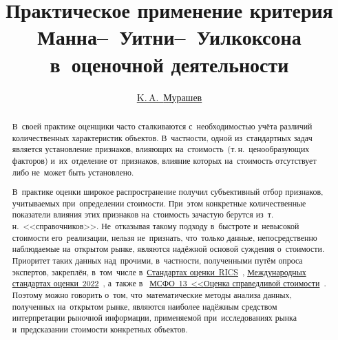 \documentclass[]{scrreprt}
\title{Практическое применение критерия Манна--~Уитни--~Уилкоксона в~оценочной деятельности}
\author{\href{https://www.facebook.com/murashev.kirill/}{K.\,A.~{Мурашев}}}
\begin{document}
	
\maketitle
%
%	
\begin{abstract}
	В~своей практике оценщики часто сталкиваются с~необходимостью учёта различий количественных характеристик объектов. В~частности, одной из~стандартных задач является установление признаков, влияющих на~стоимость~(т.\,н.~ценообразующих факторов) и~их~отделение от~признаков, влияние которых на~стоимость отсутствует либо не~может быть установлено.
	
	В~практике оценки широкое распространение получил субъективный отбор признаков, учитываемых при~определении стоимости. При~этом конкретные количественные показатели влияния этих признаков на~стоимость зачастую берутся из~т.\,н.~<<справочников>>. Не~отказывая такому подходу в~быстроте и~невысокой стоимости его~реализации, нельзя не~признать, что~только данные, непосредственно наблюдаемые на~открытом рынке, являются надёжной основой суждения о~стоимости. Приоритет таких данных над~прочими, в~частности, полученными путём опроса экспертов, закреплён, в~том~числе в~\href{https://www.rics.org/uk/upholding-professional-standards/sector-standards/valuation/red-book/red-book-global/}{Стандартах оценки~RICS}~\cite{RVGS-2022}, \href{https://www.rics.org/uk/upholding-professional-standards/sector-standards/valuation/red-book/international-valuation-standards/}{Международных стандартах оценки~2022}~\cite{IVS-2022}, а~также в~ \href{https://normativ.kontur.ru/document?moduleId=1&documentId=326168#l0}{МСФО~13~<<Оценка справедливой стоимости}~\cite{MSFO-13}. Поэтому можно говорить о~том, что~математические методы анализа данных, полученных на~открытом рынке, являются наиболее надёжным средством интерпретации рыночной информации, применяемой при~исследованиях рынка и~предсказании стоимости конкретных объектов.
	

\end{abstract}
\end{document}
